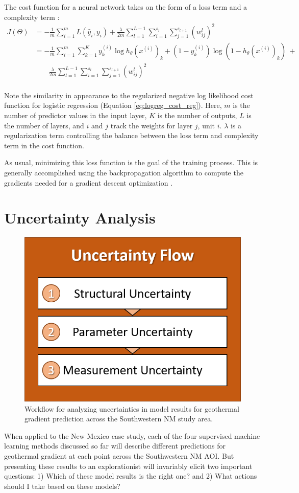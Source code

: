 The cost function for a neural network takes on the form of a loss term and a complexity term \citep{ng_neural_2011}:
\begin{equation}
\label{eq:nn_cost_function}
    \begin{aligned}
        J(\Theta) &= 
        -\frac{1}{m}\sum_{i=1}^{m}{
        L(\hat{y}_i, y_i)} + \frac{\lambda}{2m}
        \sum_{l=1}^{L-1}{
        \sum_{i=1}^{s_l}{
        \sum_{j=1}^{s_{l+1}}{(w_{ij}^{l})^2}}} \\
        &= -\frac{1}{m}
        \sum_{i=1}^{m}{
        \sum_{k=1}^{K}{
        y_k^{(i)}\log{h_{\theta}(x^{(i)})_k}+
        (1-y_k^{(i)})\log{(1-h_{\theta}(x^{(i)})_k)}}}\ + \\
        &\qquad \frac{\lambda}{2m}
        \sum_{l=1}^{L-1}{
        \sum_{i=1}^{s_l}{
        \sum_{j=1}^{s_{l+1}}{(w_{ij}^{l})^2}}}
    \end{aligned}
\end{equation}
\\
Note the similarity in appearance to the regularized negative log likelihood cost function for logistic regression (Equation \ref{eq:logreg_cost_reg}). Here, $m$ is the number of predictor values in the input layer, $K$ is the number of outputs, $L$ is the number of layers, and $i$ and $j$ track the weights for layer $j$, unit $i$. $\lambda$ is a regularization term controlling the balance between the loss term and complexity term in the cost function. 

As usual, minimizing this loss function is the goal of the training process. This is generally accomplished using the backpropagation algorithm to compute the gradients needed for a gradient descent optimization \citep[p.\ 396]{hastie_elements_2009}.

\section{Uncertainty Analysis}\label{ch3:uncertainty_analysis}
\begin{figure}
\centering
\includegraphics[width=.4\textwidth]{templates/images/Flow-Uncertainty.png}
\singlespacing
\caption[Uncertainty analysis workflow]{Workflow for analyzing uncertainties in model results for geothermal gradient prediction across the Southwestern NM study area.}
\label{fig:uncertainty_flow}
\end{figure}
When applied to the New Mexico case study, each of the four supervised machine learning methods discussed so far will describe different predictions for geothermal gradient at each point across the Southwestern NM AOI. But presenting these results to an explorationist will invariably elicit two important questions: 1) Which of these model results is the right one? and 2) What actions should I take based on these models? 

